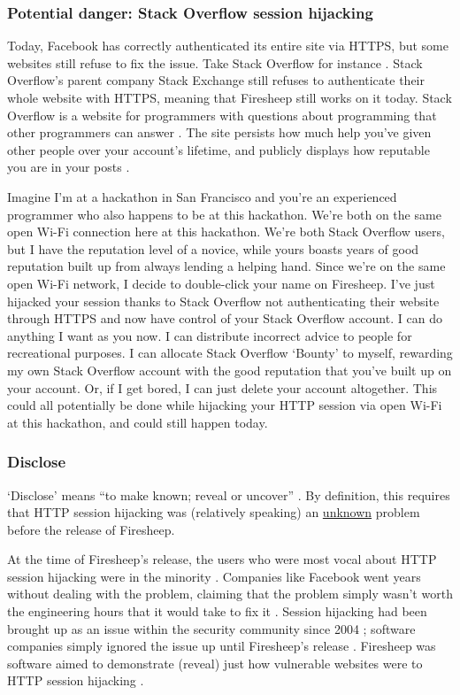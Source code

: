\documentclass[11pt]{article}
\begin{document}
\begin{multicols}{2}
\subsubsection*{Potential danger: Stack Overflow session hijacking}
Today, Facebook has correctly authenticated its entire site via HTTPS, but some websites still refuse to fix the issue. Take Stack Overflow for instance \cite{stack-exchange}. Stack Overflow's parent company Stack Exchange still refuses to authenticate their whole website with HTTPS, meaning that Firesheep still works on it today. Stack Overflow is a website for programmers with questions about programming that other programmers can answer \cite{stack-overflow-stats}. The site persists how much help you've given other people over your account's lifetime, and publicly displays how reputable you are in your posts \cite{stack-overflow-stats}. 

Imagine I'm at a hackathon in San Francisco and you're an experienced programmer who also happens to be at this hackathon. We're both on the same open Wi-Fi connection here at this hackathon. We're both Stack Overflow users, but I have the reputation level of a novice, while yours boasts years of good reputation built up from always lending a helping hand. Since we're on the same open Wi-Fi network, I decide to double-click your name on Firesheep. I've just hijacked your session thanks to Stack Overflow not authenticating their website through HTTPS and now have control of your Stack Overflow account. I can do anything I want as you now. I can distribute incorrect advice to people for recreational purposes. I can allocate Stack Overflow `Bounty' to myself, rewarding my own Stack Overflow account with the good reputation that you've built up on your account. Or, if I get bored, I can just delete your account altogether. This could all potentially be done while hijacking your HTTP session via open Wi-Fi at this hackathon, and could still happen today.


\subsubsection{Disclose}
`Disclose' means ``to make known; reveal or uncover'' \cite{disclose}. By definition, this requires that HTTP session hijacking was (relatively speaking) an \uline{unknown} problem before the release of Firesheep.

At the time of Firesheep's release, the users who were most vocal about HTTP session hijacking were in the minority \cite{firesheep-day-later}. Companies like Facebook went years without dealing with the problem, claiming that the problem simply wasn't worth the engineering hours that it would take to fix it \cite{firesheep-day-later}. Session hijacking had been brought up as an issue within the security community since 2004 \cite{firesheep-day-later}; software companies simply ignored the issue up until Firesheep's release \cite{firesheep-day-later}. Firesheep was software aimed to demonstrate (reveal) just how vulnerable websites were to HTTP session hijacking \cite{eric-butler}.


\end{multicols}
\end{document}
